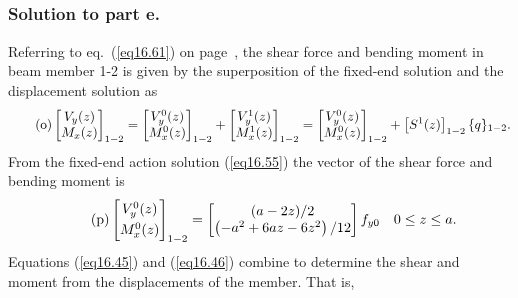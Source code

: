 \documentclass{AeroStructure-ERJohnson}
\begin{document}
\begin{example*}
\begin{align}
\end{align}

\vspace*{-1.3pc}\pagebreak

\subsubsection{Solution to part e.} Referring to eq.~(\ref{eq16.61}) on page~\pageref{eq16.61}, the shear force and bending moment in beam member 1-2 is given by the superposition of the fixed-end solution and the displacement solution as
\begin{align}\label{eq16.7o}\tag{o}
\left[\begin{array}{@{}c@{}}V_{y}(z) \\M_{x}(z)\end{array}\right]_{1-2}=\left[\begin{array}{@{}c@{}}V_{y}^{0}(z) \\M_{x}^{0}(z)\end{array}\right]_{1-2}+\left[\begin{array}{@{}c@{}}V_{y}^{1}(z) \\M_{x}^{1}(z)\end{array}\right]_{1-2}=\left[\begin{array}{@{}c@{}}V_{y}^{0}(z) \\M_{x}^{0}(z)\end{array}\right]_{1-2}+\left[S^{1}(z)\right]_{1-2}\{q\}_{1-2}.
\end{align}
From the fixed-end action solution (\ref{eq16.55}) the vector of the shear force and bending moment is
\begin{align}\label{eq16.7p}\tag{p}
\left[\begin{array}{@{}c@{}}V_{y}^{0}(z) \\[3pt]M_{x}^{0}(z)\end{array}\right]_{1-2}=\left[\begin{array}{@{}c@{}}(a-2 z) / 2 \\\left(-a^{2}+6 a z-6 z^{2}\right) / 12\end{array}\right] f_{y 0} \quad 0 \leq z \leq a.
\end{align}
Equations (\ref{eq16.45}) and (\ref{eq16.46}) combine to determine the shear and moment from the displacements of the member. That is,
\begin{align}\label{eq16.7q}\tag{q}

\end{align}
\end{example*}
\end{document}

